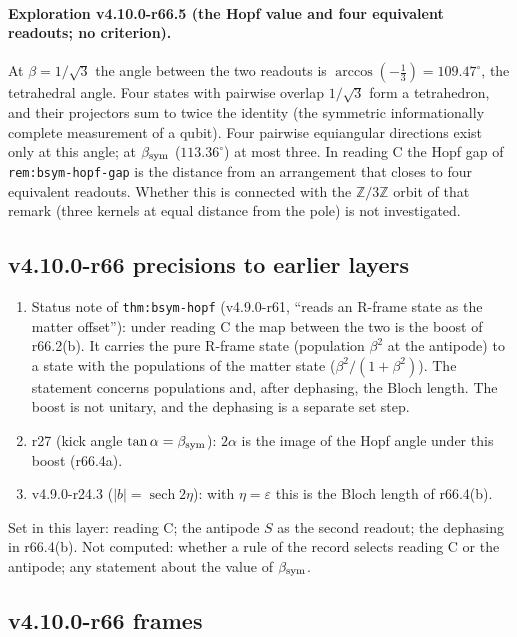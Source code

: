 \paragraph{Exploration v4.10.0-r66.5 (the Hopf value and four equivalent readouts; no criterion).}
At \(\beta=1/\sqrt3\) the angle between the two readouts is \(\arccos(-\tfrac13)=109.47^\circ\), the tetrahedral angle.  Four states with pairwise
overlap \(1/\sqrt3\) form a tetrahedron, and their projectors sum to twice the identity (the symmetric informationally complete measurement of a
qubit).  Four pairwise equiangular directions exist only at this angle; at \(\beta_{\rm sym}\) (\(113.36^\circ\)) at most three.  In reading C the Hopf
gap of \texttt{rem:bsym-hopf-gap} is the distance from an arrangement that closes to four equivalent readouts.  Whether this is connected with the
\(\mathbb Z/3\mathbb Z\) orbit of that remark (three kernels at equal distance from the pole) is not investigated.

\subsection*{v4.10.0-r66 precisions to earlier layers}
\label{subsec:v4100-r66-precisions}

\begin{enumerate}[leftmargin=2em]
\item[(a)] Status note of \texttt{thm:bsym-hopf} (v4.9.0-r61, ``reads an R-frame state as the matter offset''): under reading C the map between the
two is the boost of r66.2(b).  It carries the pure R-frame state (population \(\beta^2\) at the antipode) to a state with the populations of the
matter state (\(\beta^2/(1+\beta^2)\)).  The statement concerns populations and, after dephasing, the Bloch length.  The boost is not unitary, and the
dephasing is a separate set step.
\item[(b)] r27 (kick angle \(\tan\alpha=\beta_{\rm sym}\)): \(2\alpha\) is the image of the Hopf angle under this boost (r66.4a).
\item[(c)] v4.9.0-r24.3 (\(|b|=\operatorname{sech}2\eta\)): with \(\eta=\varepsilon\) this is the Bloch length of r66.4(b).
\end{enumerate}
Set in this layer: reading C; the antipode \(S\) as the second readout; the dephasing in r66.4(b).  Not computed: whether a rule of the record selects
reading C or the antipode; any statement about the value of \(\beta_{\rm sym}\).

\subsection*{v4.10.0-r66 frames}
\label{subsec:v4100-r66-frames}

